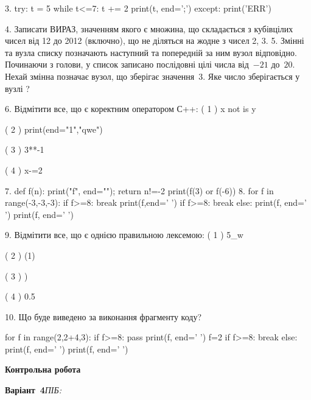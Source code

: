 \documentclass[11pt]{article}
\begin{document}
3. 
try:
    t = 5
    while t<=7:
        t += 2
    print(t, end=';')
except:
    print('ERR')

4. 
Записати ВИРАЗ, значенням якого є множина, що складається з кубівцілих чисел від 12 до 2012 (включно), що не діляться на жодне з чисел 2, 3.
5. 
Змінні  та  вузла списку позначають наступний та попередній за ним вузол відповідно. Починаючи з голови, у список записано послідовні цілі числа від~$-21$ до~$20$. Нехай змінна  позначає вузол, що зберігає значення~$3$.
Яке число зберігається у вузлі  ?

6. %
Відмітити все, що є коректним оператором С++:
( 1 ) x not is y

( 2 ) print(end="1","qwe")

( 3 ) 3**-1

( 4 ) x-=2

7. 
def f(n): print("f", end=""); return n!=-2
   print(f(3) or f(-6))
8. 
for f in range(-3,-3,-3):
    if f>=8:
        break
        print(f,end=' ')
    if f>=8:
        break
else:
    print(f, end=' ')
print(f, end=' ')

9. %
Відмітити все, що є однією правильною лексемою:
( 1 ) 5_w

( 2 ) (1)

( 3 ) )

( 4 ) 0.5

10. Що буде виведено за виконання фрагменту коду?

for f in range(2,2+4,3):
    if f>=8:
        pass
    print(f, end=' ')
    f=2
    if f>=8:
        break
else:
    print(f, end=' ')
print(f, end=' ')











\newpage

\newpage

{\large\textbf{Контрольна робота}}

\textbf{Варіант \No\,4}\hfill \textit{ПІБ:}\,\underline{\hspace{60mm}}
\vspace{4mm}
\end{document}
